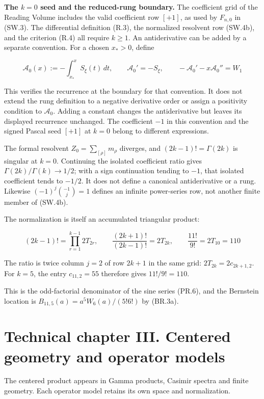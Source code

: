 \documentclass[
  11pt,
]{book}
\begin{document}
\textbf{The \(k=0\) seed and the reduced-rung boundary.} The coefficient
grid of the Reading Volume includes the valid coefficient row \([+1]\),
as used by \(F_{n,0}\) in (SW.3). The differential definition (R.3), the
normalized resolvent row (SW.4b), and the criterion (R.4) all require
\(k\ge1\). An antiderivative can be added by a separate convention. For
a chosen \(x_*>0\), define

\[
\mathcal A_0(x):=-\int_{x_*}^{x}S_\xi(t)\,dt,\qquad
\mathcal A_0'=-S_\xi,\qquad
-\mathcal A_0'-x\mathcal A_0''=W_1
\tag{SW.4g}
\]

This verifies the recurrence at the boundary for that convention. It
does not extend the rung definition to a negative derivative order or
assign a positivity condition to \(\mathcal A_0\). Adding a constant
changes the antiderivative but leaves its displayed recurrence
unchanged. The coefficient \(-1\) in this convention and the signed
Pascal seed \([+1]\) at \(k=0\) belong to different expressions.

The formal resolvent \(Z_0=\sum_{[\rho]}m_\rho\) diverges, and
\((2k-1)!=\Gamma(2k)\) is singular at \(k=0\). Continuing the isolated
coefficient ratio gives \(\Gamma(2k)/\Gamma(k)\to1/2\); with a sign
continuation tending to \(-1\), that isolated coefficient tends to
\(-1/2\). It does not define a canonical antiderivative or a rung.
Likewise \((-1)^j\binom{-1}{j}=1\) defines an infinite power-series row,
not another finite member of (SW.4b).

The normalization is itself an accumulated triangular product:

\[
(2k-1)!=\prod_{r=1}^{k-1}2T_{2r},\qquad
\frac{(2k+1)!}{(2k-1)!}=2T_{2k},\qquad
\frac{11!}{9!}=2T_{10}=110
\tag{SW.4d}
\]

The ratio is twice column \(j=2\) of row \(2k+1\) in the same grid:
\(2T_{2k}=2c_{2k+1,2}\). For \(k=5\), the entry \(c_{11,2}=55\)
therefore gives \(11!/9!=110\).

This is the odd-factorial denominator of the sine series (PR.6), and the
Bernstein location is \(B_{11,5}(a)=a^5W_6(a)/(5!6!)\) by (BR.3a).


\chapter{Technical chapter III. Centered geometry and operator
models}\label{technical-chapter-iii.-centered-geometry-and-operator-models}

The centered product appears in Gamma products, Casimir spectra and
finite geometry. Each operator model retains its own space and
normalization.
\end{document}
